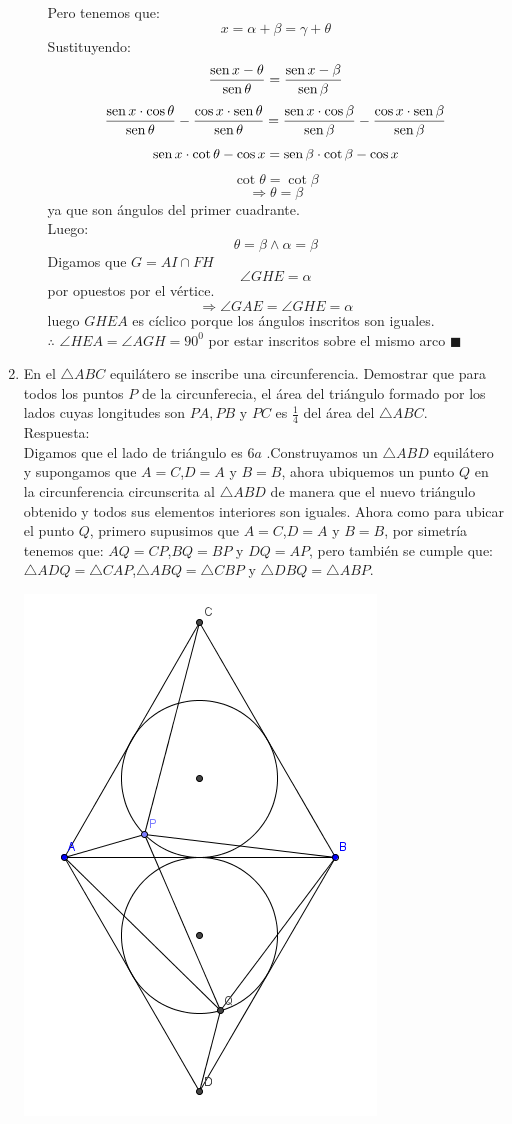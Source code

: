 \documentclass{book}
\newcommand{\sen}{\mathop{\rm sen}\nolimits} %
\begin{document}
\begin{enumerate}
\begin{enumerate}
Pero tenemos que:
$$x=\alpha+\beta=\gamma+\theta$$
Sustituyendo:
$${\sen {x-\theta}\over\sen \theta}={\sen {x-\beta}\over\sen \beta}$$
$$\frac{\sen x\cdot\cos \theta}{\sen \theta}-\frac{\cos x\cdot\sen \theta}{\sen \theta}=\frac{\sen x\cdot\cos \beta}{\sen \beta}-\frac{\cos x\cdot\sen \beta}{\sen \beta}$$
$$\sen x\cdot\cot \theta-\cos x=\sen \beta\cdot\cot \beta-\cos x$$
$$\cot \theta=\cot \beta$$
$$\Rightarrow\theta=\beta$$
ya que son ángulos del primer cuadrante.\\
Luego:
$$\theta=\beta\wedge\alpha=\beta$$
Digamos que $G=AI\cap FH$
$$\angle GHE=\alpha$$
por opuestos por el vértice.
$$\Rightarrow\angle GAE=\angle GHE=\alpha$$
luego $GHEA$ es cíclico porque los ángulos inscritos son iguales.\\
$\therefore$ $\angle HEA=\angle AGH=90^0$ por estar inscritos sobre el mismo arco $\blacksquare$\\
					\end{enumerate}
				\item En el $\triangle ABC$ equilátero se inscribe una circunferencia. Demostrar que para todos los puntos $P$ de la circunferecia, el área del triángulo formado por los lados cuyas longitudes son $PA, PB$ y $PC$ es $\displaystyle{\frac{1}{4}}$ del área del $\triangle ABC$. \\
					Respuesta:\\
					Digamos que el lado de triángulo es $6a$ .Construyamos un $\triangle ABD$ equilátero y supongamos que $A=C$,$D=A$ y $B=B$, ahora ubiquemos un punto $Q$ en la circunferencia circunscrita al $\triangle ABD$ de manera que el nuevo triángulo obtenido y todos sus elementos interiores son iguales.
Ahora como para ubicar el punto $Q$, primero supusimos que $A=C$,$D=A$ y $B=B$, por simetría tenemos que: $AQ=CP$,$BQ=BP$ y $DQ=AP$, pero también se cumple que: $\triangle ADQ=\triangle CAP$,$\triangle ABQ=\triangle CBP$ y $\triangle DBQ=\triangle ABP$. 
					\begin{center}
							\includegraphics[scale=1]{imagenes/Geometria/24,1.png}

\end{center}
\end{enumerate}
\end{document}

